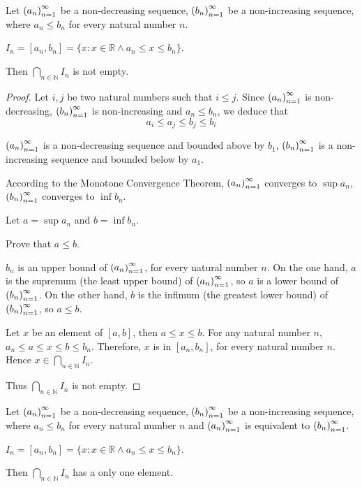 \begin{theorem}
    Let ${\left({a_{n}}\right)}^{\infty}_{n=1}$ be a non-decreasing sequence, ${\left({b_{n}}\right)}^{\infty}_{n=1}$ be a non-increasing sequence, where $a_{n} \le b_{n}$ for every natural number $n$.

    $I_{n} = [a_{n}, b_{n}] = \{ x: x\in\mathbb{R} \land a_{n} \le x \le b_{n} \}$.

    Then $\bigcap\limits_{n\in\mathbb{N}} {I_{n}}$ is not empty.
\end{theorem}

\begin{proof}
    Let $i, j$ be two natural numbers such that $i\le j$. Since ${\left({a_{n}}\right)}^{\infty}_{n=1}$ is non-decreasing, ${\left({b_{n}}\right)}^{\infty}_{n=1}$ is non-increasing and $a_{n} \le b_{n}$, we deduce that
    \begin{equation*}
        a_{i} \le a_{j} \le b_{j} \le b_{i}
        \tag{$\star$}
    \end{equation*}

    ${\left({a_{n}}\right)}^{\infty}_{n=1}$ is a non-decreasing sequence and bounded above by $b_{1}$, ${\left({b_{n}}\right)}^{\infty}_{n=1}$ is a non-increasing sequence and bounded below by $a_{1}$.

    According to the Monotone Convergence Theorem, ${\left({a_{n}}\right)}^{\infty}_{n=1}$ converges to $\sup{a_{n}}$, ${\left({b_{n}}\right)}^{\infty}_{n=1}$ converges to $\inf{b_{n}}$.

    Let $a = \sup{a_{n}}$ and $b = \inf{b_{n}}$.

    Prove that $a\le b$.

    $b_{n}$ is an upper bound of ${\left({a_{n}}\right)}^{\infty}_{n=1}$, for every natural number $n$. On the one hand, $a$ is the supremum (the least upper bound) of ${\left({a_{n}}\right)}^{\infty}_{n=1}$, so $a$ is a lower bound of ${\left({b_{n}}\right)}^{\infty}_{n=1}$. On the other hand, $b$ is the infimum (the greatest lower bound) of ${\left({b_{n}}\right)}^{\infty}_{n=1}$, so $a\le b$.

    Let $x$ be an element of $[a, b]$, then $a \le x \le b$. For any natural number $n$, $a_{n}\le a \le x \le b \le b_{n}$. Therefore, $x$ is in $[a_{n}, b_{n}]$, for every natural number $n$. Hence $x\in\bigcap\limits_{n\in\mathbb{N}} {I_{n}}$.

    Thus $\bigcap\limits_{n\in\mathbb{N}} {I_{n}}$ is not empty.
\end{proof}

\begin{theorem}
    Let ${\left({a_{n}}\right)}^{\infty}_{n=1}$ be a non-decreasing sequence, ${\left({b_{n}}\right)}^{\infty}_{n=1}$ be a non-increasing sequence, where $a_{n} \le b_{n}$ for every natural number $n$ and ${\left({a_{n}}\right)}^{\infty}_{n=1}$ is equivalent to ${\left({b_{n}}\right)}^{\infty}_{n=1}$.

    $I_{n} = [a_{n}, b_{n}] = \{ x: x\in\mathbb{R} \land a_{n} \le x \le b_{n} \}$.

    Then $\bigcap\limits_{n\in\mathbb{N}} {I_{n}}$ has a only one element.
\end{theorem}

